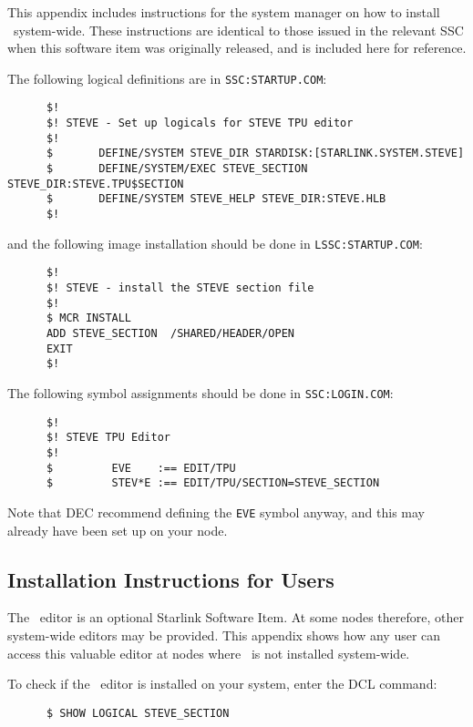 This appendix includes instructions for the system manager on how to install
\STEve\ system-wide. These instructions are identical to those issued in the
relevant SSC when this software item was originally released, and is included
here for reference.

The following logical definitions are in {\tt SSC:STARTUP.COM}:
\begin{small}
\begin{verbatim}
      $!
      $! STEVE - Set up logicals for STEVE TPU editor
      $!
      $       DEFINE/SYSTEM STEVE_DIR STARDISK:[STARLINK.SYSTEM.STEVE]
      $       DEFINE/SYSTEM/EXEC STEVE_SECTION STEVE_DIR:STEVE.TPU$SECTION
      $       DEFINE/SYSTEM STEVE_HELP STEVE_DIR:STEVE.HLB
      $!
\end{verbatim}
\end{small}
and the following image installation should be done in
{\tt LSSC:STARTUP.COM}:
\begin{small}
\begin{verbatim}
      $!
      $! STEVE - install the STEVE section file
      $!
      $ MCR INSTALL
      ADD STEVE_SECTION  /SHARED/HEADER/OPEN
      EXIT
      $!
\end{verbatim}
\end{small}
The following symbol assignments should be done in {\tt SSC:LOGIN.COM}:
\begin{small}
\begin{verbatim}
      $!
      $! STEVE TPU Editor
      $!
      $         EVE    :== EDIT/TPU
      $         STEV*E :== EDIT/TPU/SECTION=STEVE_SECTION
\end{verbatim}
\end{small}
Note that DEC recommend defining the {\tt EVE} symbol anyway, and this may
already have been set up on your node.

\subsection{Installation Instructions for Users}

The \STEve\ editor is an optional Starlink Software Item. At some nodes
therefore, other system-wide editors may be provided. This appendix shows how
any user can access this valuable editor at nodes where \STEve\ is not
installed system-wide.

To check if the \STEve\ editor is installed on your system, enter the DCL
command:

\begin{verbatim}
      $ SHOW LOGICAL STEVE_SECTION
\end{verbatim}

